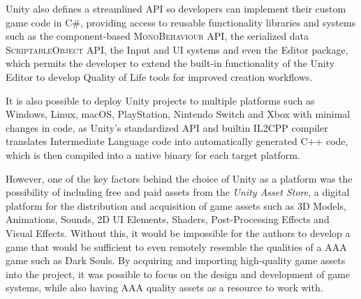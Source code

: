 Unity also defines a streamlined API so developers can implement their custom game code in \textsc{C\#}, providing access to reusable functionality libraries and systems such as the component-based \textsc{MonoBehaviour} API, the serialized data \textsc{ScriptableObject} API, the Input and UI systems and even the Editor package, which permits the developer to extend the built-in functionality of the Unity Editor to develop Quality of Life tools for improved creation workflows.

It is also possible to deploy Unity projects to multiple platforms such as Windows, Linux, macOS, PlayStation, Nintendo Switch and Xbox with minimal changes in code, as Unity's standardized API and builtin \textsc{IL2CPP} compiler translates Intermediate Language code into automatically generated \textsc{C++} code, which is then compiled into a native binary for each target platform.

However, one of the key factors behind the choice of Unity as a platform was the possibility of including free and paid assets from the \emph{Unity Asset Store}, a digital platform for the distribution and acquisition of game assets such as 3D Models, Animations, Sounds, 2D UI Elements, Shaders, Post-Processing Effects and Visual Effects. Without this, it would be impossible for the authors to develop a game that would be sufficient to even remotely resemble the qualities of a AAA game such as Dark Souls. By acquiring and importing high-quality game assets into the project, it was possible to focus on the design and development of game systems, while also having AAA quality assets as a resource to work with.

